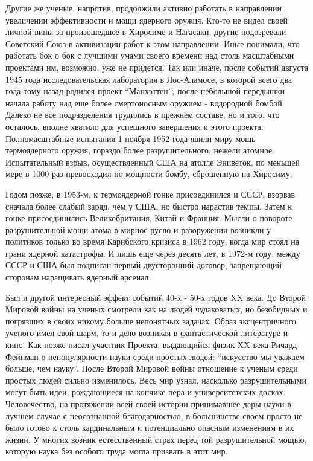 Другие же ученые, напротив, продолжили активно работать в направлении увеличении эффективности и мощи ядерного оружия.
Кто-то не видел своей личной вины за произошедшее в Хиросиме и Нагасаки, другие подозревали Советский Союз в активизации работ к этом направлении.
Иные понимали, что работать бок о бок с лучшими умами своего времени над столь масштабными проектами им, возможно, уже не придется. 
Так или иначе, после событий августа 1945 года исследовательская лаборатория в Лос-Аламосе, в которой всего два года тому назад родился проект ``Манхэттен'', после небольшой передышки начала работу над еще более смертоносным оружием - водородной бомбой.
Далеко не все подразделения трудились в прежнем составе, но и того, что осталось, вполне хватило для успешного завершения и этого проекта. 
Полномасштабные испытания 1 ноября 1952 года явили миру мощь термоядерного оружия, гораздо более разрушительного, нежели атомное.
Испытательный взрыв, осуществленный США на атолле Эниветок, по меньшей мере в 1000 раз превосходил по мощности бомбу, сброшенную на Хиросиму.

Годом позже, в 1953-м, к термоядерной гонке присоединился и СССР, взорвав сначала более слабый заряд, чем у США, но быстро нарастив темпы. 
Затем к гонке присоединились Великобритания, Китай и Франция.
Мысли о повороте разрушительной мощи атома в мирное русло и разоружении возникли у политиков только во время Карибского кризиса в 1962 году, когда мир стоял на грани ядерной катастрофы. 
И лишь еще через десять лет, в 1972-м году, между СССР и США был подписан первый двусторонний договор, запрещающий сторонам наращивать ядерный арсенал.

Был и другой интересный эффект событий 40-х - 50-х годов XX века.
До Второй Мировой войны на ученых смотрели как на людей чудаковатых, но безобидных и погрязших в своих никому больше непонятных задачах. 
Образ эксцентричного ученого имел свой шарм, то и дело возникая в фантастической литературе и кино.
Как позже писал участник Проекта, выдающийся физик XX века Ричард Фейнман о непопулярности науки среди простых людей: ``искусство мы уважаем больше, чем науку''.
После Второй Мировой войны отношение к ученым среди простых людей сильно изменилось.
Весь мир узнал, насколько разрушительными могут быть идеи, рождающиеся на кончике пера и университетских досках.
Человечество, на протяжении всей своей истории принимавшее дары науки в лучшем случае с неосознанной благодарностью, в большинстве своем просто не было готово к столь кардинальным и потенциально опасным изменениям в их жизни.
У многих возник естесственный страх перед той разрушительной мощью, которую наука без особого труда могла призвать в этот мир. 

